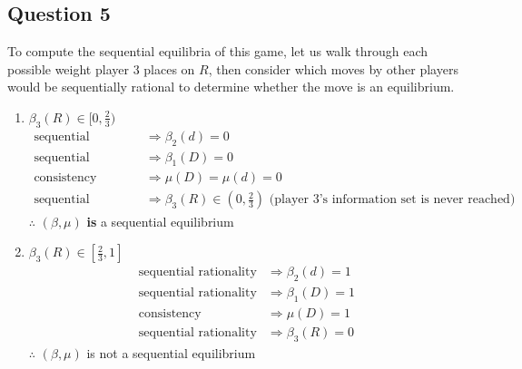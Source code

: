 \documentclass{article}
\begin{document}
\subsection*{Question 5}
To compute the sequential equilibria of this game, let us walk through each possible weight player 3 places on $R$, then consider which moves by other players would be sequentially rational to determine whether the move is an equilibrium.
\begin{enumerate}
	\item $\beta_3(R)\in[0,\frac{2}{3})$
		\begin{align*}
			\text{sequential rationality} 	&\Rightarrow \beta_2(d) = 0	\\
			\text{sequential rationality} 	&\Rightarrow \beta_1(D) = 0	\\
			\text{consistency}				&\Rightarrow \mu(D) = \mu(d) = 0	\\
			\text{sequential rationality} 	&\Rightarrow \beta_3(R)\in(0,\frac{2}{3}) \text{ (player 3's information set is never reached)}
		\end{align*}
		$\therefore$ $(\beta,\mu)$ \textbf{is} a sequential equilibrium 
		
	\item $\beta_3(R)\in[\frac{2}{3},1]$
		\begin{align*}
			\text{sequential rationality} 	&\Rightarrow \beta_2(d) = 1	\\
			\text{sequential rationality} 	&\Rightarrow \beta_1(D) = 1	\\
			\text{consistency}				&\Rightarrow \mu(D) = 1		\\
			\text{sequential rationality} 	&\Rightarrow \beta_3(R) = 0
		\end{align*}
		$\therefore$ $(\beta,\mu)$ is not a sequential equilibrium
\end{enumerate}
\end{document}
